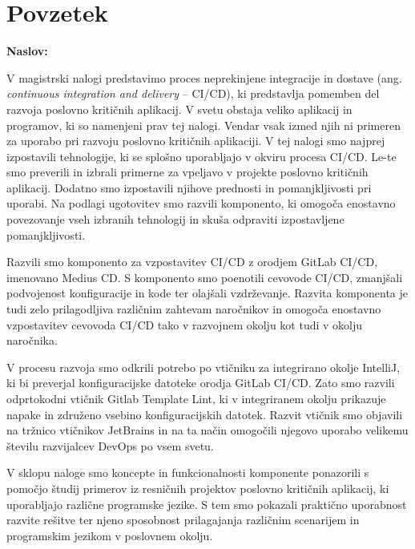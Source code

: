 \chapter*{Povzetek}

\noindent\textbf{Naslov:} \ttitle
\bigskip

V magistrski nalogi predstavimo proces neprekinjene integracije in dostave (ang. \textit{continuous integration and delivery} – CI/CD), ki predstavlja pomemben del razvoja poslovno kritičnih aplikacij. V svetu obstaja veliko aplikacij in programov, ki so namenjeni prav tej nalogi. Vendar vsak izmed njih ni primeren za uporabo pri razvoju poslovno kritičnih aplikaciji. V tej nalogi smo najprej izpostavili tehnologije, ki se splošno uporabljajo v okviru procesa CI/CD. Le-te smo preverili in izbrali primerne za vpeljavo v projekte poslovno kritičnih aplikacij. Dodatno smo izpostavili njihove prednosti in pomanjkljivosti pri uporabi. Na podlagi ugotovitev smo razvili komponento, ki omogoča enostavno povezovanje vseh izbranih tehnologij in skuša odpraviti izpostavljene pomanjkljivosti.

Razvili smo komponento za vzpostavitev CI/CD z orodjem GitLab CI/CD, imenovano Medius CD. S komponento smo poenotili cevovode CI/CD, zmanjšali podvojenost konfiguracije in kode ter olajšali vzdrževanje. Razvita komponenta je tudi zelo prilagodljiva različnim zahtevam naročnikov in omogoča enostavno vzpostavitev cevovoda CI/CD tako v razvojnem okolju kot tudi v okolju naročnika.

V procesu razvoja smo odkrili potrebo po vtičniku za integrirano okolje IntelliJ, ki bi preverjal konfiguracijske datoteke orodja GitLab CI/CD. Zato smo razvili odprtokodni vtičnik Gitlab Template Lint, ki v integriranem okolju prikazuje napake in združeno vsebino konfiguracijskih datotek. Razvit vtičnik smo objavili na tržnico vtičnikov JetBrains in na ta način omogočili njegovo uporabo velikemu številu razvijalcev DevOps po vsem svetu.

V sklopu naloge smo koncepte in funkcionalnosti komponente ponazorili s pomočjo študij primerov iz resničnih projektov poslovno kritičnih aplikacij, ki uporabljajo različne programske jezike. S tem smo pokazali praktično uporabnost razvite rešitve ter njeno sposobnost prilagajanja različnim scenarijem in programskim jezikom v poslovnem okolju.


